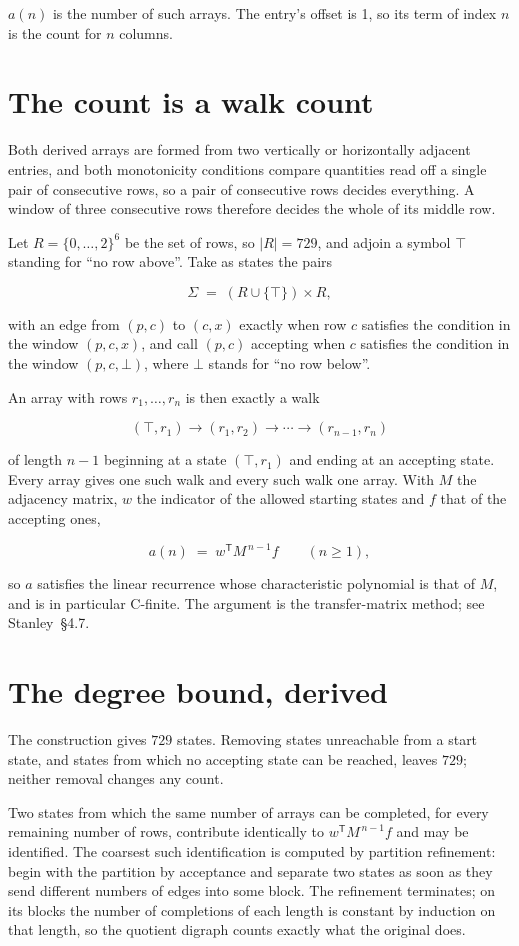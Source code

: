\documentclass[11pt]{article}
\theoremstyle{definition}
\begin{document}
$a(n)$ is the number of such arrays. The entry's offset is 1, so its term of index $n$ is the count for $n$ columns.

\section{The count is a walk count}

Both derived arrays are formed from two vertically or horizontally adjacent entries, and both monotonicity conditions compare quantities read off a single pair of consecutive rows, so a pair of consecutive rows decides everything. A window of three consecutive rows therefore decides the whole of its middle row.

Let $R = \{0,\dots,2\}^{6}$ be the set of rows, so $|R| = 729$, and adjoin a symbol $\top$ standing for ``no row above''. Take as states the pairs

\[\Sigma \;=\; (R \cup \{\top\}) \times R,\]

with an edge from $(p,c)$ to $(c,x)$ exactly when row $c$ satisfies the condition in the window $(p,c,x)$, and call $(p,c)$ accepting when $c$ satisfies the condition in the window $(p,c,\bot)$, where $\bot$ stands for ``no row below''.

An array with rows $r_1,\dots,r_n$ is then exactly a walk

\[(\top,r_1) \to (r_1,r_2) \to \cdots \to (r_{n-1},r_n)\]

of length $n-1$ beginning at a state $(\top,r_1)$ and ending at an accepting state. Every array gives one such walk and every such walk one array. With $M$ the adjacency matrix, $w$ the indicator of the allowed starting states and $f$ that of the accepting ones,

\[a(n) \;=\; w^{\mathsf T} M^{\,n-1} f \qquad (n \ge 1),\]

so $a$ satisfies the linear recurrence whose characteristic polynomial is that of $M$, and is in particular C-finite. The argument is the transfer-matrix method; see Stanley~\S4.7.

\section{The degree bound, derived}

The construction gives $729$ states. Removing states unreachable from a start state, and states from which no accepting state can be reached, leaves $729$; neither removal changes any count.

Two states from which the same number of arrays can be completed, for every remaining number of rows, contribute identically to $w^{\mathsf T}M^{\,n-1}f$ and may be identified. The coarsest such identification is computed by partition refinement: begin with the partition by acceptance and separate two states as soon as they send different numbers of edges into some block. The refinement terminates; on its blocks the number of completions of each length is constant by induction on that length, so the quotient digraph counts exactly what the original does.
\end{document}
